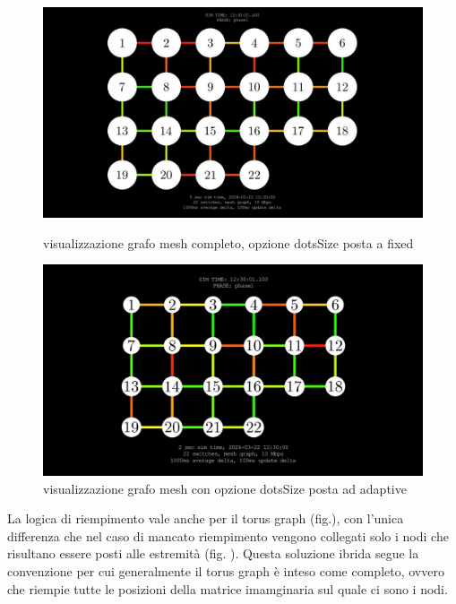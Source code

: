 \documentclass[binding=0.6cm]{sapthesis}
\begin{document}
\begin{figure}[h]
    \centering
    \begin{minipage}{0.48\textwidth}
      \includegraphics[width=\linewidth]{immagini/mesh_not_full.JPG}
      \caption{visualizzazione grafo mesh completo, opzione dotsSize posta a fixed}
      \label{fig:mesh_not_full}
    \end{minipage}\hfill
    \begin{minipage}{0.48\textwidth}
      \includegraphics[width=\linewidth]{immagini/adaptive_dots_example.JPG}
      \caption{visualizzazione grafo mesh con opzione dotsSize posta ad adaptive}
      \label{fig:adaptive_dots_example}
    \end{minipage}
\end{figure}

La logica di riempimento vale anche per il torus graph (fig.), con l'unica differenza che nel caso di mancato riempimento vengono collegati solo i nodi
che risultano essere posti alle estremità (fig. ). Questa soluzione ibrida segue la convenzione per cui generalmente il torus graph è inteso come completo,
ovvero che riempie tutte le posizioni della matrice imamginaria sul quale ci sono i nodi.
\end{document}
